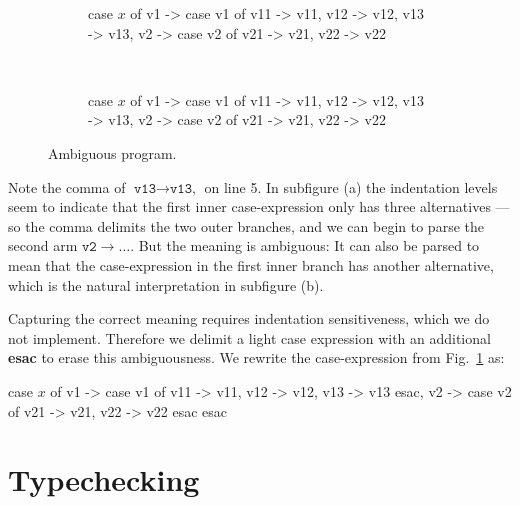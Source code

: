 \begin{figure}[ht!]
  \centering
  \begin{subfigure}[b]{0.49\textwidth}
    \begin{rfuncode}
           case $x$ of
             v1 -> case v1 of
                     v11 -> v11,
                     v12 -> v12,
                     v13 -> v13,
             v2 -> case v2 of
                     v21 -> v21,
                     v22 -> v22
    \end{rfuncode}
  \caption{}
  \end{subfigure}
~
  \begin{subfigure}[b]{0.49\textwidth}
    \begin{rfuncode}
        case $x$ of
          v1 -> case v1 of
                  v11 -> v11,
                  v12 -> v12,
                  v13 -> v13,
                  v2  -> case v2 of
                           v21 -> v21,
                           v22 -> v22
    \end{rfuncode}
  \caption{}
  \end{subfigure}
  \caption{Ambiguous program.}\label{fig:ambiguous_parsing}
\end{figure}

Note the comma of $\texttt{v13} \rightarrow \texttt{v13,}$ on line 5. In
subfigure (a) the indentation levels seem to indicate that the first inner
case-expression only has three alternatives --- so the comma delimits the two
outer branches, and we can begin to parse the second arm $\texttt{v2}
\rightarrow \dots$. But the meaning is ambiguous: It can also be parsed to mean
that the case-expression in the first inner branch has another alternative,
which is the natural interpretation in subfigure (b).

Capturing the correct meaning requires indentation sensitiveness, which we do
not implement. Therefore we delimit a light case expression with an additional
\textbf{esac} to erase this ambiguousness. We rewrite the case-expression from
Fig.~\ref{fig:ambiguous_parsing} as:

\begin{rfuncode}
case $x$ of
  v1 -> case v1 of
          v11 -> v11,
          v12 -> v12,
          v13 -> v13
        esac,
  v2 -> case v2 of
          v21 -> v21,
          v22 -> v22
        esac
  esac
\end{rfuncode}

\section{Typechecking}

